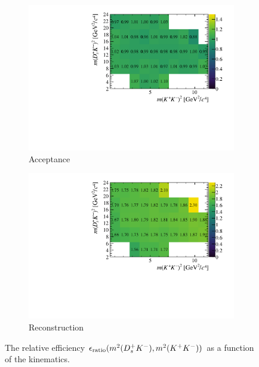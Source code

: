 \begin{figure}[!h]
   \centering
   \begin{subfigure}[t]{0.45\textwidth}
      \includegraphics[width=1.0\textwidth]{figs/B2DsKK/Relative_Eff_gen_All_Full.pdf}
      \caption{Acceptance}
      \label{fig:B2DsKK_releff_acceptance}
   \end{subfigure}
   \begin{subfigure}[t]{0.45\textwidth}
      \includegraphics[width=1.0\textwidth]{figs/B2DsKK/Relative_Eff_reco_All.pdf}
      \caption{Reconstruction}
      \label{fig:B2DsKK_releff_reconstruction}
   \end{subfigure}
   \caption{The relative efficiency $\epsilon_{\text{ratio}}(m^{2}({{D}^+_{s}}{{K}^-}),m^{2}({{K}^+}{{K}^-}))$ as a function of the \decay{\Bp}{\Dsp\Kp\Km} kinematics.}
   \label{fig:B2DsKK_dalitz_eff_one}
\end{figure}


